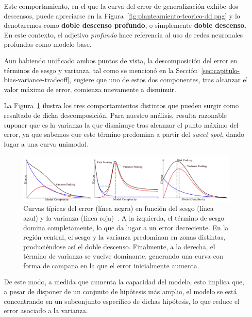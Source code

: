 Este comportamiento, en el que la curva del error de generalización exhibe dos descensos, puede apreciarse en la Figura~\ref{fig:planteamiento-teorico-dd.png} y lo denotaremos como \textbf{doble descenso profundo}, o simplemente \textbf{doble descenso}. En este contexto, el adjetivo \textit{profundo} hace referencia al uso de redes neuronales profundas como modelo base.\newline

Aun habiendo unificado ambos puntos de vista, la descomposición del error en términos de sesgo y varianza, tal como se mencionó en la Sección~\ref{sec:capitulo-bias-variance-tradeoff}, sugiere que uno de estos dos componentes, tras alcanzar el valor máximo de error, comienza nuevamente a disminuir.\newline

La Figura~\ref{fig:bias-variance-peak} ilustra los tres comportamientos distintos que pueden surgir como resultado de dicha descomposición. Para nuestro análisis, resulta razonable suponer que es la varianza la que disminuye tras alcanzar el punto máximo del error, ya que sabemos que este término predomina a partir del \textit{sweet spot}, dando lugar a una curva unimodal.\newline

\begin{figure}[h]
    \centering
    \includegraphics[width=0.8\linewidth]{img/bias-variance-peak.png}
    \caption[Curvas típicas del error en función del sesgo y la varianza~\cite{Yang2020}.]{Curvas típicas del error (línea negra) en función del sesgo (línea azul) y la varianza (línea roja)~\cite{Yang2020}. A la izquierda, el término de sesgo domina completamente, lo que da lugar a un error decreciente. En la región central, el sesgo y la varianza predominan en zonas distintas, produciéndose así el doble descenso. Finalmente, a la derecha, el término de varianza se vuelve dominante, generando una curva con forma de campana en la que el error inicialmente aumenta.}\label{fig:bias-variance-peak}
\end{figure}

De este modo, a medida que aumenta la capacidad del modelo, esto implica que, a pesar de disponer de un conjunto de hipótesis más amplio, el modelo se está concentrando en un subconjunto específico de dichas hipótesis, lo que reduce el error asociado a la varianza.\newline

